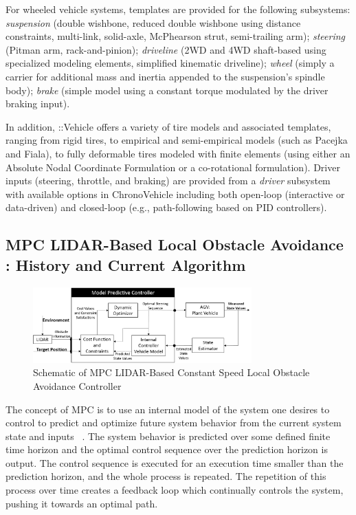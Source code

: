 \documentclass[12pt,onecolumn]{article}
\newcommand{\CHRONO}{{\sffamily{{Chrono}}}}
\newcommand{\ChronoVehicle}{{\sffamily{Chrono}}::Vehicle}
\begin{document}
For wheeled vehicle systems, templates are provided for the following subsystems:
{\em suspension} (double wishbone, reduced double wishbone using distance constraints, multi-link, solid-axle, McPhearson strut, semi-trailing arm);
{\em steering} (Pitman arm, rack-and-pinion);
{\em driveline} (2WD and 4WD shaft-based using specialized {\CHRONO} modeling elements, simplified kinematic driveline);
{\em wheel} (simply a carrier for additional mass and inertia appended to the suspension's spindle body);
{\em brake} (simple model using a constant torque modulated by the driver braking input).

In addition, {\ChronoVehicle} offers a variety of tire models and associated templates, ranging from rigid tires, to empirical and semi-empirical models (such as Pacejka and Fiala), to fully deformable tires modeled with finite elements (using either an Absolute Nodal Coordinate Formulation or a co-rotational formulation).  Driver inputs (steering, throttle, and braking) are provided from a {\em driver} subsystem with available options in {ChronoVehicle} including both open-loop (interactive or data-driven) and closed-loop (e.g., path-following based on PID controllers).


\subsection{MPC LIDAR-Based Local Obstacle Avoidance : History and Current Algorithm }\label{MPC}


\begin{figure}
	\centering
	\includegraphics[width=0.75\textwidth]{Figs/MPCBlockDiagram.png}
	\caption{{\small Schematic of MPC LIDAR-Based Constant Speed Local Obstacle Avoidance Controller}}    
	\label{fig:MPC_schematic}
\end{figure}

The concept of MPC is to use an internal model of the system one desires to control to predict and optimize future system behavior from the current system state and inputs ~\cite{Allgower&Findeisen2002}. The system behavior is predicted over some defined finite time horizon and the optimal control sequence over the prediction horizon is output. The control sequence is executed for an execution time smaller than the prediction horizon, and the whole process is repeated. The repetition of this process over time creates a feedback loop which continually controls the system, pushing it towards an optimal path.
\end{document}
